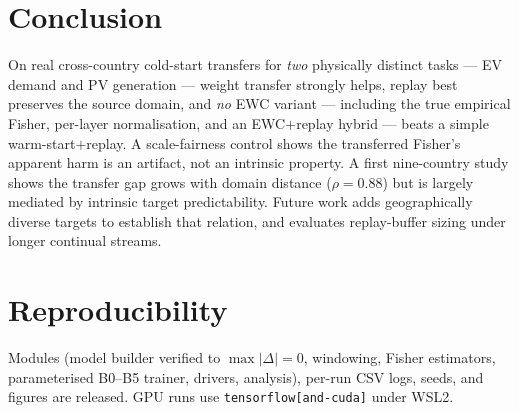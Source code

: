 \documentclass[conference]{IEEEtran}
\begin{document}
\section{Conclusion}
On real cross-country cold-start transfers for \emph{two} physically distinct
tasks --- EV demand and PV generation --- weight transfer strongly helps, replay
best preserves the source domain, and \emph{no} EWC variant --- including the true
empirical Fisher, per-layer normalisation, and an EWC$+$replay hybrid --- beats a
simple warm-start$+$replay. A scale-fairness control shows the transferred
Fisher's apparent harm is an artifact, not an intrinsic property. A first
nine-country study shows the transfer gap grows with domain distance
($\rho{=}0.88$) but is largely mediated by intrinsic target predictability.
Future work adds geographically diverse targets to establish that relation, and
evaluates replay-buffer sizing under longer continual streams.

\section*{Reproducibility}
Modules (model builder verified to $\max|\Delta|{=}0$, windowing, Fisher
estimators, parameterised B0--B5 trainer, drivers, analysis), per-run CSV logs,
seeds, and figures are released. GPU runs use \texttt{tensorflow[and-cuda]} under
WSL2.
\end{document}
